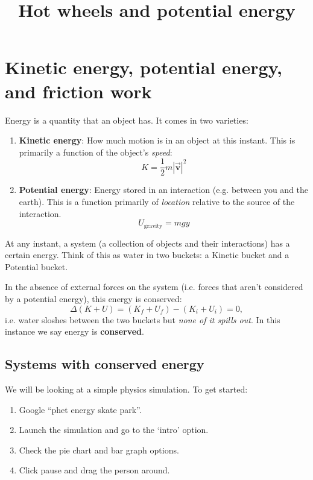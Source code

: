 \documentclass{handout}
\title{Hot wheels and potential energy}
\begin{document}
\maketitle

\section{Kinetic energy, potential energy, and friction work}

Energy is a quantity that an object has. It comes in two varieties:
\begin{enumerate}
    \item \textbf{Kinetic energy}: How much motion is in an object at this instant. This is primarily a function of the object's \textit{speed}:
    $$
    K=\frac{1}{2} m |\vec{\boldsymbol{v}}|^2
    $$
    \item \textbf{Potential energy}: Energy stored in an interaction (e.g. between you and the earth). This is a function primarily of \textit{location} relative to the source of the interaction. $$ U_\text{gravity} = mgy$$
\end{enumerate}

At any instant, a system (a collection of objects and their interactions) has a certain energy. Think of this as water in two buckets: a Kinetic bucket and a Potential bucket.

In the absence of external forces on the system (i.e. forces that aren't considered by a potential energy), this energy is conserved:$$\Delta (K+U)=(K_f+U_f)-(K_i+U_i)=0,$$
i.e. water sloshes between the two buckets but \textit{none of it spills out}. In this instance we say energy is \textbf{conserved}.

\subsection{Systems with conserved energy}
We will be looking at a simple physics simulation. To get started:
\begin{enumerate}
    \item Google ``phet energy skate park''.
    \item Launch the simulation and go to the `intro' option.
    \item Check the pie chart and bar graph options.
    \item Click pause and drag the person around.
\end{enumerate}
\end{document}
